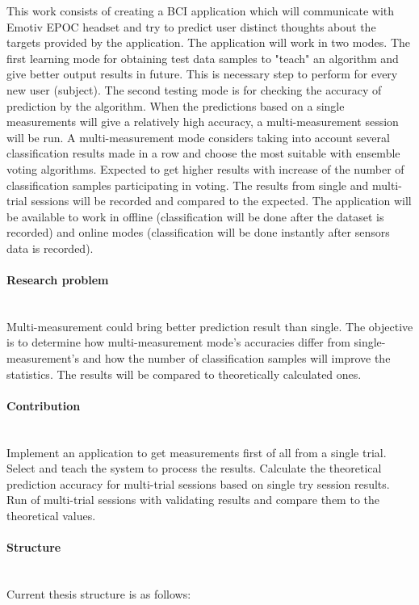 \documentclass[12pt]{article}
\begin{document}
This work consists of creating a BCI application which will communicate with Emotiv EPOC headset and try to predict user distinct thoughts about the targets provided by the application. The application will work in two modes. The first learning mode for obtaining test data samples to "teach" an algorithm and give better output results in future. This is necessary step to perform for every new user (subject). The second testing mode is for checking the accuracy of prediction by the algorithm. When the predictions based on a single measurements will give a relatively high accuracy, a multi-measurement session will be run. A multi-measurement mode considers taking into account several classification results made in a row and choose the most suitable with ensemble voting algorithms. Expected to get higher results with increase of the number of classification samples participating in voting. The results from single and multi-trial sessions will be recorded and compared to the expected. The application will be available to work in offline (classification will be done after the dataset is recorded) and online modes (classification will be done instantly after sensors data is recorded).
\paragraph{Research problem}~\\

Multi-measurement could bring better prediction result than single. The objective is to determine how multi-measurement mode's accuracies differ from single-measurement's and how the number of classification samples will improve the statistics. The results will be compared to theoretically calculated ones.
\paragraph{Contribution}~\\

Implement an application to get measurements first of all from a single trial. Select and teach the system to process the results. Calculate the theoretical prediction accuracy for multi-trial sessions based on single try session results. Run of multi-trial sessions with validating results and compare them to the theoretical values.
\paragraph{Structure}~\\
Current thesis structure is as follows:
\end{document}

